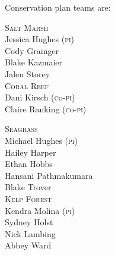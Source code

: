 \documentclass[t]{beamer}
\begin{document}
\begin{frame}[t]{Conservation plan teams are:}

\begin{multicols}{2}

\textsc{Salt Marsh}\\
Jessica Hughes (\textsc{pi}) \\
Cody Grainger  \\
Blake Kazmaier \\
Jalen Storey   \\[2\baselineskip]

\textsc{Coral Reef}\\
Dani Kirsch (\textsc{c}o-\textsc{pi})\\
Claire Ranking (\textsc{c}o-\textsc{pi})\\

\columnbreak

\textsc{Seagrass}\\
Michael Hughes (\textsc{pi}) \\
Hailey Harper \\
Ethan Hobbs \\
Hansani Pathmakumara \\
Blake Trover \\[1\baselineskip]

\textsc{Kelp Forest}\\
Kendra Molina (\textsc{pi}) \\
Sydney Holst \\
Nick Lambing \\
Abbey Ward   \\

%


\end{multicols}

\end{frame}
\end{document}
